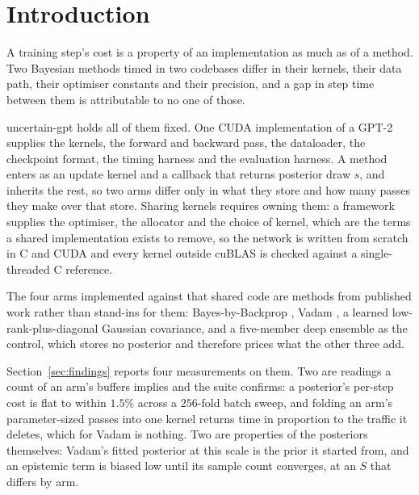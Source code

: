 \section{Introduction}
\label{sec:intro}


A training step's cost is a property of an implementation as much as of a method.
Two Bayesian methods timed in two codebases differ in their kernels, their data path,
their optimiser constants and their precision, and a gap in step time between them is
attributable to no one of those.

uncertain-gpt holds all of them fixed. One CUDA implementation of a GPT-2
\citep{radford2019language} supplies the kernels, the forward and backward pass,
the dataloader, the checkpoint format, the timing harness and the evaluation
harness. A method enters as an update kernel and a callback that returns posterior
draw $s$, and inherits the rest, so two arms differ only in what they store and how
many passes they make over that store. Sharing kernels requires owning them: a
framework supplies the optimiser, the allocator and the choice of kernel, which are
the terms a shared implementation exists to remove, so the network is written from
scratch in C and CUDA and every kernel outside cuBLAS is checked against a
single-threaded C reference.

The four arms implemented against that shared code are methods from published work
rather than stand-ins for them: Bayes-by-Backprop \citep{blundell2015weight}, Vadam
\citep{khan2018vadam}, a learned low-rank-plus-diagonal Gaussian covariance, and a
five-member deep ensemble \citep{lakshminarayanan2017simple} as the control, which
stores no posterior and therefore prices what the other three add.

Section~\ref{sec:findings} reports four measurements on them. Two are readings a
count of an arm's buffers implies and the suite confirms: a posterior's per-step cost
is flat to within $1.5\%$ across a $256$-fold batch sweep, and folding an arm's
parameter-sized passes into one kernel returns time in proportion to the traffic it
deletes, which for Vadam is nothing. Two are properties of the posteriors themselves:
Vadam's fitted posterior at this scale is the prior it started from, and an epistemic
term is biased low until its sample count converges, at an $S$ that differs by arm.
